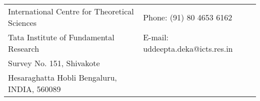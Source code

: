 \vspace{.05in}
\begin{tabular}{@{}p{3.5in}p{3in}}
International Centre for Theoretical Sciences & {Phone:} (91) 80 4653 6162 \\
Tata Institute of Fundamental Research & {E-mail:} uddeepta.deka@icts.res.in\\
Survey No. 151, Shivakote \\
Hesaraghatta Hobli
Bengaluru, INDIA, 560089
\end{tabular}